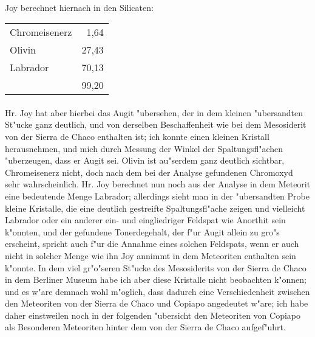 \documentclass[a4paper, 11pt, oneside]{article}
\begin{document}
\paragraph{}
Joy berechnet hiernach in den Silicaten:
\begin{center}
\begin{tabular}{ l r }
    Chromeisenerz & 1,64\\
    Olivin & 27,43\\
    Labrador & 70,13\\
     & 99,20\\
\end{tabular}
\end{center}
\paragraph{}
Hr. Joy hat aber hierbei das Augit "ubersehen, der in dem kleinen "ubersandten St"ucke ganz deutlich, und von derselben Beschaffenheit wie bei dem Mesosiderit von der Sierra de Chaco enthalten ist; ich konnte einen kleinen Kristall herausnehmen, und mich durch Messung der Winkel der Spaltungsfl"achen "uberzeugen, dass er Augit sei. Olivin ist au"serdem ganz deutlich sichtbar, Chromeisenerz nicht, doch nach dem bei der Analyse gefundenen Chromoxyd sehr wahrscheinlich. Hr. Joy berechnet nun noch aus der Analyse in dem Meteorit eine bedeutende Menge Labrador; allerdings sieht man in der "ubersandten Probe kleine Kristalle, die eine deutlich gestreifte Spaltungsfl"ache zeigen und vielleicht Labrador oder ein anderer ein- und eingliedriger Feldspat wie Anorthit sein k"onnten, und der gefundene Tonerdegehalt, der f"ur Augit allein zu gro"s erscheint, spricht auch f"ur die Annahme eines solchen Feldspats, wenn er auch nicht in solcher Menge wie ihn Joy annimmt in dem Meteoriten enthalten sein k"onnte. In dem viel gr"o"seren St"ucke des Mesosiderits von der Sierra de Chaco in dem Berliner Museum habe ich aber diese Kristalle nicht beobachten k"onnen; und es w"are demnach wohl m"oglich, dass dadurch eine Verschiedenheit zwischen den Meteoriten von der Sierra de Chaco und Copiapo angedeutet w"are; ich habe daher einstweilen noch in der folgenden "ubersicht den Meteoriten von Copiapo als Besonderen Meteoriten hinter dem von der Sierra de Chaco aufgef"uhrt.
\end{document}
